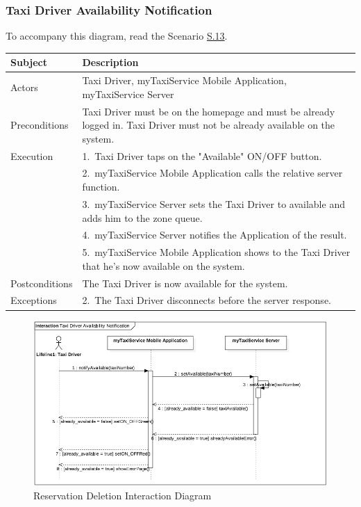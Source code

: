 \subsubsection{Taxi Driver Availability Notification}
			To accompany this diagram, read the Scenario \hyperref[sec:TaxiDriverAvailabilityScenario]{S.13}.

				\begin{table}[htpb]
					\centering
					\label{tab:TaxiDriverAvailabilityTable}
					\begin{tabularx}{\textwidth}{lp{9cm}}
						\hline
						\hline
							\textbf{Subject}
						& 
							\textbf{Description}\\
						\hline
							Actors	       &  Taxi Driver, myTaxiService Mobile Application, myTaxiService Server\\
						\hline
							Preconditions  &  Taxi Driver must be on the homepage and must be already logged in. Taxi Driver must not be already available on the system.\\
						\hline
							Execution      &  1.~Taxi Driver taps on the "Available" ON/OFF button.\\
										   &  2.~myTaxiService Mobile Application calls the relative server function.\\
										   &  3.~myTaxiService Server sets the Taxi Driver to available and adds him to the zone queue.\\
										   &  4.~myTaxiService Server notifies the Application of the result.\\
										   &  5.~myTaxiService Mobile Application shows to the Taxi Driver that he's now available on the system.\\
						\hline
							Postconditions &  The Taxi Driver is now available for the system.\\
						\hline
							Exceptions     &  2.~The Taxi Driver disconnects before the server response.\\
									
						\hline
						\hline
					\end{tabularx}
				\end{table}
				
				\begin{figure}[H]
					\centering
					\includegraphics[width=\textwidth, scale=0.5]{IMG/InteractionDiagrams/TaxiDriverAvailability.png}
					\caption{Reservation Deletion Interaction Diagram}\label{sec:FigureTaxiDriverAvailability}
				\end{figure}